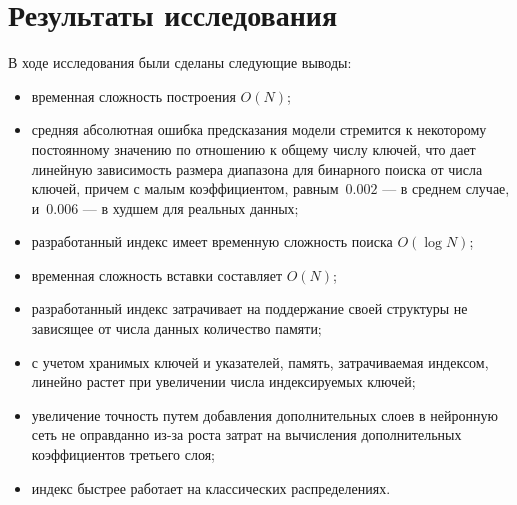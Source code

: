 \section{Результаты исследования}

В ходе исследования были сделаны следующие выводы:
\begin{itemize}
    \item временная сложность построения $O(N)$;
    \item средняя абсолютная ошибка предсказания модели стремится к некоторому
        постоянному значению по отношению к общему числу ключей, что дает
        линейную зависимость размера диапазона для бинарного поиска от числа
        ключей, причем с малым коэффициентом, равным~$0.002$ --- в среднем 
        случае, и~$0.006$ --- в худшем для реальных данных;
    \item разработанный индекс имеет временную сложность поиска $O(\log N)$;
    \item временная сложность вставки составляет $O(N)$;
    \item разработанный индекс затрачивает на поддержание своей структуры не
        зависящее от числа данных количество памяти;
    \item с учетом хранимых ключей и указателей, память, затрачиваемая индексом,
        линейно растет при увеличении числа индексируемых ключей;
    \item увеличение точность путем добавления дополнительных слоев в нейронную
        сеть не оправданно из-за роста затрат на вычисления дополнительных
        коэффициентов третьего слоя;
    \item индекс быстрее работает на классических распределениях.
\end{itemize}

